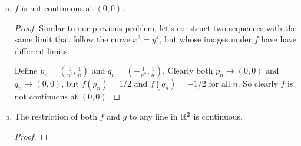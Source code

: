 \documentclass{article}
\begin{document}
\begin{enumerate}
\begin{enumerate}[a.]
\begin{proof}
To show this rigorously, let's construct an unbounded sequence on the graph of
$f$ that follows this unbounded ridge.

Define $p_n = (\frac{1}{n^3}, \frac{1}{n})$ so that $f(p_n) = \frac{n}{2}$.
Let $\epsilon > 0$ be arbitrarily small and let $M > 0$ be arbitrarily large.
If $n \geq 2M$ then $f(p_n) \geq M$. And by the algebraic limit theorem, there's
some $N$ where if $n \geq N$ then $\frac{1}{n^6} + \frac{1}{n^2} < \epsilon^2$.
This shows that $\lvert (\frac{1}{n^3}, \frac{1}{n}) \rvert < \epsilon$. Taking
$n \geq \max \{ 2M, N \}$ shows that $g$ is unbounded on every neighborhood of
$(0, 0)$.
\end{proof}

\item \claim $f$ is not continuous at $(0, 0)$.
\begin{proof}
Similar to our previous problem, let's construct two sequences with the same
limit that follow the curve $x^2 = y^4$, but whose images under $f$ have have
different limits.

Define $p_n = (\frac{1}{n^2}, \frac{1}{n})$ and
$q_n = (-\frac{1}{n^2}, \frac{1}{n})$. Clearly both $p_n \to (0, 0)$ and
$q_n \to (0, 0)$, but $f(p_n) = 1/2$ and $f(q_n) = -1/2$ for all $n$. So clearly
$f$ is not continuous at $(0, 0)$.
\end{proof}

\item \claim The restriction of both $f$ and $g$ to any line in $\mathbb{R}^2$ is
      continuous.

\begin{proof}
\end{proof}
\end{enumerate}
        
\end{enumerate}
\end{document}
